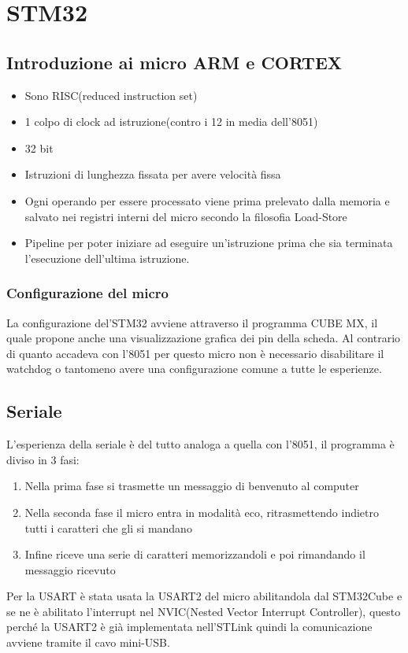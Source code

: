 \documentclass[main.tex]{subfiles}
\begin{document}
\chapter{STM32}
\section{Introduzione ai micro ARM e CORTEX}
\begin{itemize}
    \item Sono RISC(reduced instruction set)
    \item 1 colpo di clock ad istruzione(contro i 12 in media dell'8051)
    \item 32 bit
    \item Istruzioni di lunghezza fissata per avere velocità fissa
    \item Ogni operando per essere processato viene prima prelevato dalla memoria e salvato nei registri interni del micro secondo la filosofia Load-Store
    \item Pipeline per poter iniziare ad eseguire un'istruzione prima che sia terminata l'esecuzione dell'ultima istruzione.
\end{itemize}
\subsection{Configurazione del micro}
La configurazione del'STM32 avviene attraverso il programma CUBE MX, il quale propone anche una visualizzazione grafica dei pin della scheda. Al contrario di quanto accadeva con l'8051 per questo micro non è necessario disabilitare il watchdog o tantomeno avere una configurazione comune a tutte le esperienze.
\section{Seriale}
L'esperienza della seriale è del tutto analoga a quella con l'8051, il programma è diviso in 3 fasi:\begin{enumerate}
    \item Nella prima fase si trasmette un messaggio di benvenuto al computer
    \item Nella seconda fase il micro entra in modalità eco, ritrasmettendo indietro tutti i caratteri che gli si mandano
    \item Infine riceve una serie di caratteri memorizzandoli e poi rimandando il messaggio ricevuto
\end{enumerate}
Per la USART è stata usata la USART2 del micro abilitandola dal STM32Cube e se ne è abilitato l'interrupt nel NVIC(Nested Vector Interrupt Controller), questo perché la USART2 è già implementata nell'STLink quindi la comunicazione avviene tramite il cavo mini-USB. 
\end{document}
